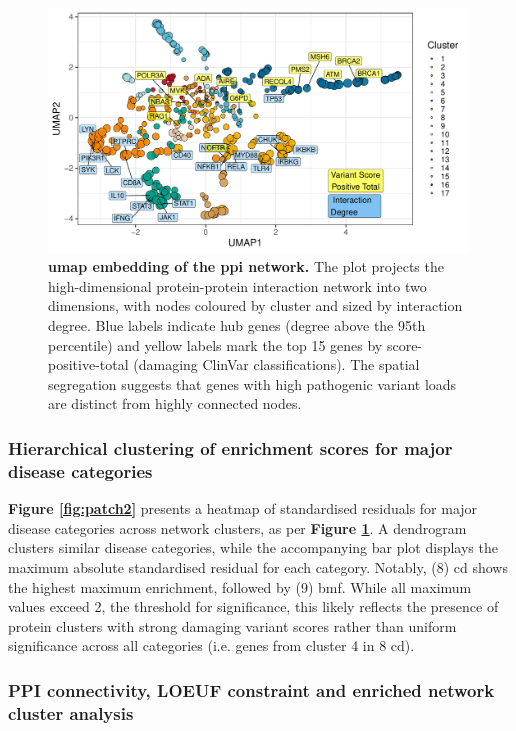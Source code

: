 \begin{figure}[ht]
  \centering
  \includegraphics[width=0.99\textwidth]{../images/untangleR_ppi_network_umap.pdf}
  \caption{
    \textbf{\ac{umap} embedding of the \ac{ppi} network.} 
    The plot projects the high-dimensional protein-protein interaction network into two dimensions, with nodes coloured by cluster and sized by interaction degree. Blue labels indicate hub genes (degree above the 95th percentile) and yellow labels mark the top 15 genes by score-positive-total (damaging ClinVar classifications). The spatial segregation suggests that genes with high pathogenic variant loads are distinct from highly connected nodes.
  }
  \label{fig:p_umap}
\end{figure}

\FloatBarrier
\subsubsection{Hierarchical clustering of enrichment scores for major disease categories}
\textbf{Figure \ref{fig:patch2}} presents a heatmap of standardised residuals for major disease categories across network clusters, as per \textbf{Figure \ref{fig:p_umap}}. 
A dendrogram clusters similar disease categories, while the accompanying bar plot displays the maximum absolute standardised residual for each category.
Notably, (8) \ac{cd} shows the highest maximum enrichment, followed by 
(9) \ac{bmf}. 
While all maximum values exceed 2, the threshold for significance, this likely reflects the presence of protein clusters with strong damaging variant scores rather than uniform significance across all categories (i.e. genes from cluster 4 in 8 \ac{cd}).


\subsubsection{PPI connectivity, LOEUF constraint and enriched network cluster analysis}

